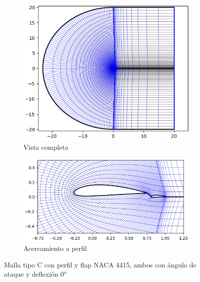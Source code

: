 \documentclass[letterpaper, openright, 12pt]{book}
\begin{document}
    \begin{figure}[htbp!]
        \centering
        \begin{subfigure}[c]{0.45\textwidth}
            \includegraphics[keepaspectratio,
                width=0.99\textwidth]{./img/naca4415_c_flap_far}
            \caption{Vista completa}
            \label{fig:naca4415_c_flap_far}
        \end{subfigure}
        \hfill
        \begin{subfigure}[c]{0.45\textwidth}
            \includegraphics[keepaspectratio,
                width=0.99\textwidth]{./img/naca4415_c_flap_close}
            \caption{Acercamiento a perfil}
            \label{fig:naca4415_c_flap_close}
        \end{subfigure}
        \caption[Malla tipo C con perfil y flap NACA4415]{Malla tipo C con
            perfil y flap NACA 4415, ambos con ángulo de ataque y deflexión
            $0\si{\degree}$}
        \label{fig:naca4415_c_flap}
    \end{figure}
\end{document}
